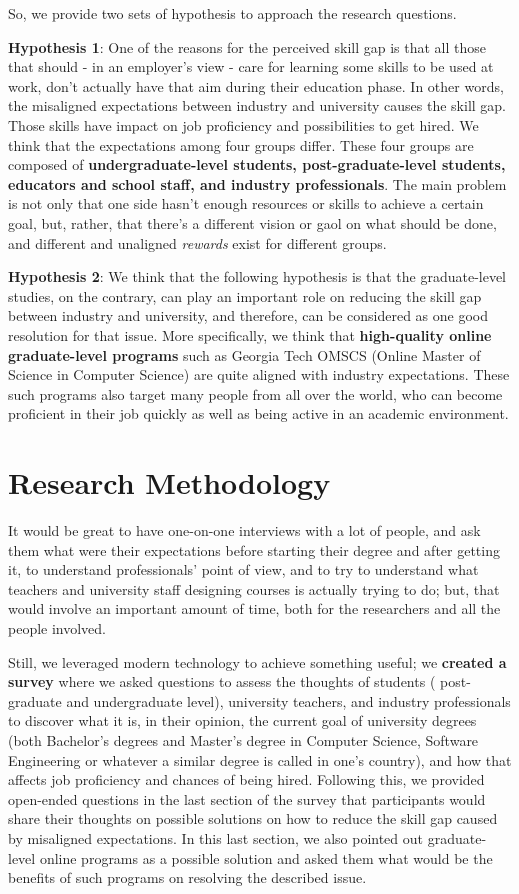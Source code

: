 \documentclass{sigchi}
\begin{document}
So, we provide two sets of hypothesis to approach the research questions.

\textbf{Hypothesis 1}: One of the reasons for the perceived skill gap is that all those that should - in an employer's view - care for learning some skills to be used at work, don't actually have that aim during their education phase. In other words, the misaligned expectations between industry and university causes the skill gap. Those skills have impact on job proficiency and possibilities to get hired. We think that the expectations among four groups differ. These four groups are composed of \textbf{undergraduate-level students, post-graduate-level students, educators and school staff, and industry professionals}. The main problem is not only that one side hasn’t enough resources or skills to achieve a certain goal, but, rather, that there’s a different vision or gaol on what should be done, and different and unaligned \textit{rewards} exist for different groups.  

\textbf{Hypothesis 2}:  We think that the following hypothesis is that the graduate-level studies, on the contrary, can play an important role on reducing the skill gap between industry and university, and therefore, can be considered as one good resolution for that issue. More specifically, we think that \textbf{high-quality online graduate-level programs} such as Georgia Tech OMSCS (Online Master of Science in Computer Science) are quite aligned with industry expectations. These such programs also target many people from all over the world, who can become proficient in their job quickly as well as being active in an academic environment.

\section{Research Methodology}
It would be great to have one-on-one interviews with a lot of people, and ask them what were their expectations before starting their degree and after getting it, to understand professionals' point of view, and to try to understand what teachers and university staff designing courses is actually trying to do; but, that would involve an important amount of time, both for the researchers and all the people involved.

Still, we leveraged modern technology to achieve something useful; we \textbf{created a survey} where we asked questions to assess the thoughts of students ( post-graduate and undergraduate level), university teachers, and industry professionals to discover what it is, in their opinion, the current goal of university degrees (both Bachelor's degrees and Master's degree in Computer Science, Software Engineering or whatever a similar degree is called in one's country), and how that affects job proficiency and chances of being hired. Following this, we provided open-ended questions in the last section of the survey that participants would share their thoughts on possible solutions on how to reduce the skill gap caused by misaligned expectations. In this last section, we also pointed out graduate-level online programs as a possible solution and asked them what would be the benefits of such programs on resolving the described issue.
\end{document}
